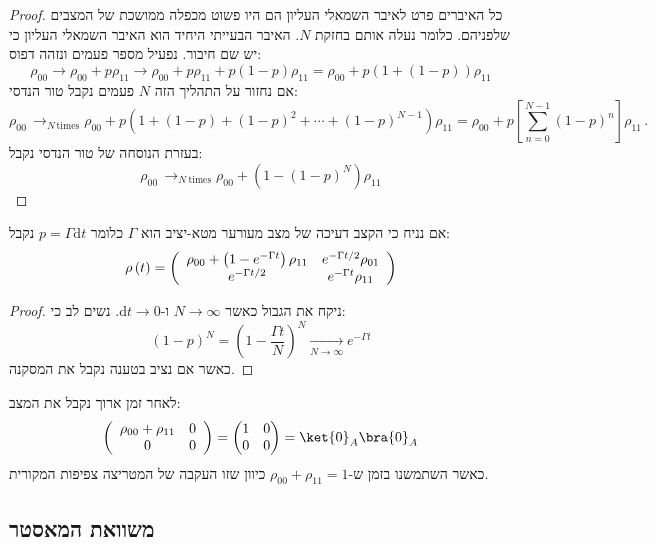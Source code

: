 \documentclass{tstextbook}
\begin{document}
\begin{proof}
כל האיברים פרט לאיבר השמאלי העליון הם היו פשוט מכפלה ממושכת של המצבים שלפניהם. כלומר נעלה אותם בחזקת \(N\). האיבר הבעייתי היחיד הוא האיבר השמאלי העליון כי יש שם חיבור. נפעיל מספר פעמים ונזהה דפוס:
$$\rho_{00}\longrightarrow\rho_{00}+p\rho_{11}\longrightarrow\rho_{00}+p\rho_{11}+p\left(1-p\right)\rho_{11}=\rho_{00}+p\left(1+\left(1-p\right)\right)\rho_{11}$$
אם נחזור על התהליך הזה \(N\) פעמים נקבל טור הנדסי:
$$\rho_{00}\,\mathop{\longrightarrow}_{N\,\mathrm{times}}\rho_{00}+p\left(1+\left(1-p\right)+\left(1-p\right)^{2}+\cdots+\left(1-p\right)^{N-1}\right)\rho_{11}=\rho_{00}+p\left[\sum_{n=0}^{N-1}\left(1-p\right)^{n}\right]\rho_{11}\,.$$
בעזרת הנוסחה של טור הנדסי נקבל:
$$\rho_{00}\,\mathop{\longrightarrow}_{N\mathrm{~times}}\rho_{00}+\left(1-\left(1-p\right)^{N}\right)\rho_{11}$$

\end{proof}
\begin{corollary}
אם נניח כי הקצב דעיכה של מצב מעורער מטא-יציב הוא \(\Gamma\) כלומר \(p=\Gamma \mathrm{d}t\) נקבל:
$$\rho\left(t\right)=\left(\begin{array}{c c}{{\rho_{00}+\left(1-e^{-\Gamma t}\right)\rho_{11}}}&{{e^{-\Gamma t/2}\rho_{01}}}\\ {{e^{-\Gamma t/2}}}&{{e^{-\Gamma t}\rho_{11}}}\end{array}\right)$$

\end{corollary}
\begin{proof}
ניקח את הגבול כאשר \(N\to \infty\) ו-\(\mathrm{d}t\to 0\). נשים לב כי:
$$\left(1-p\right)^{N}=\left(1-{\frac{\Gamma t}{N}}\right)^{N}\underset{N\longrightarrow\infty}{\longrightarrow}e^{-\Gamma t}$$
כאשר אם נציב בטענה נקבל את המסקנה.

\end{proof}
\begin{corollary}
לאחר זמן ארוך נקבל את המצב:
$$\left(\begin{array}{c c}{{\rho_{00}+\rho_{11}}}&{{0}}\\ {{0}}&{{0}}\end{array}\right)=\begin{pmatrix}1 & 0 \\0 & 0
\end{pmatrix}=\ket{0} _{A}\bra{0}_{A}$$
כאשר השתמשנו בזמן ש-\(\rho_{00}+\rho_{11}=1\) כיוון שזו העקבה של המטריצה צפיפות המקורית.

\end{corollary}
\subsection{משוואת המאסטר}
\end{document}
